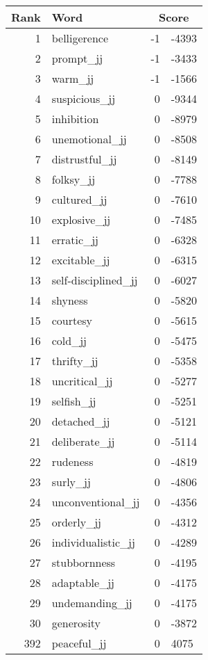 \begin{longtable}[!htbp]{| rlr@{.}l |}
    \hline
    \textbf{Rank} & \textbf{Word} & \multicolumn{2}{c|}{\textbf{Score}} \\
    \hline
    \endhead
    1 & belligerence & -1 & -4393 \\
    2 & prompt\_jj & -1 & -3433 \\
    3 & warm\_jj & -1 & -1566 \\
    4 & suspicious\_jj & 0 & -9344 \\
    5 & inhibition & 0 & -8979 \\
    6 & unemotional\_jj & 0 & -8508 \\
    7 & distrustful\_jj & 0 & -8149 \\
    8 & folksy\_jj & 0 & -7788 \\
    9 & cultured\_jj & 0 & -7610 \\
    10 & explosive\_jj & 0 & -7485 \\
    11 & erratic\_jj & 0 & -6328 \\
    12 & excitable\_jj & 0 & -6315 \\
    13 & self-disciplined\_jj & 0 & -6027 \\
    14 & shyness & 0 & -5820 \\
    15 & courtesy & 0 & -5615 \\
    16 & cold\_jj & 0 & -5475 \\
    17 & thrifty\_jj & 0 & -5358 \\
    18 & uncritical\_jj & 0 & -5277 \\
    19 & selfish\_jj & 0 & -5251 \\
    20 & detached\_jj & 0 & -5121 \\
    21 & deliberate\_jj & 0 & -5114 \\
    22 & rudeness & 0 & -4819 \\
    23 & surly\_jj & 0 & -4806 \\
    24 & unconventional\_jj & 0 & -4356 \\
    25 & orderly\_jj & 0 & -4312 \\
    26 & individualistic\_jj & 0 & -4289 \\
    27 & stubbornness & 0 & -4195 \\
    28 & adaptable\_jj & 0 & -4175 \\
    29 & undemanding\_jj & 0 & -4175 \\
    30 & generosity & 0 & -3872 \\
    392 & peaceful\_jj & 0 & 4075 \\

\end{longtable}
